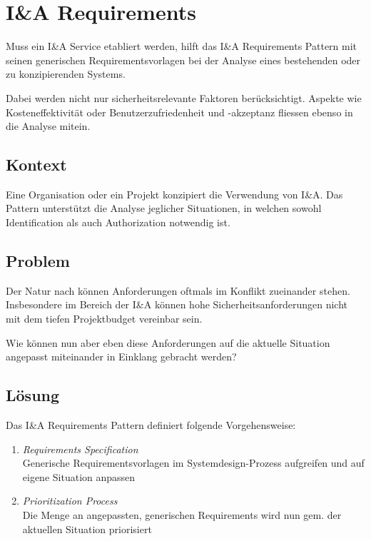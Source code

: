 \section{I\&A Requirements}
\label{sec:ianda-requriements}

Muss ein I\&A Service etabliert werden, hilft das I\&A Requirements Pattern mit seinen generischen Requirementsvorlagen bei der Analyse eines bestehenden oder zu konzipierenden Systems.

Dabei werden nicht nur sicherheitsrelevante Faktoren berücksichtigt. Aspekte wie Kosteneffektivität oder Benutzerzufriedenheit und -akzeptanz fliessen ebenso in die Analyse mitein.

\subsection*{Kontext}
Eine Organisation oder ein Projekt konzipiert die Verwendung von I\&A. Das Pattern unterstützt die Analyse jeglicher Situationen, in welchen sowohl Identification als auch Authorization notwendig ist.

\subsection*{Problem}
Der Natur nach können Anforderungen oftmals im Konflikt zueinander stehen. Insbesondere im Bereich der I\&A können hohe Sicherheitsanforderungen nicht mit dem tiefen Projektbudget vereinbar sein.

Wie können nun aber eben diese Anforderungen auf die aktuelle Situation angepasst miteinander in Einklang gebracht werden?

\subsection*{Lösung}
Das I\&A Requirements Pattern definiert folgende Vorgehensweise:

\begin{enumerate}
	\item \emph{Requirements Specification}\\
	Generische Requirementsvorlagen im Systemdesign-Prozess aufgreifen und auf eigene Situation anpassen
	\item \emph{Prioritization Process}\\
	Die Menge an angepassten, generischen Requirements wird nun gem. der aktuellen Situation priorisiert
\end{enumerate}

